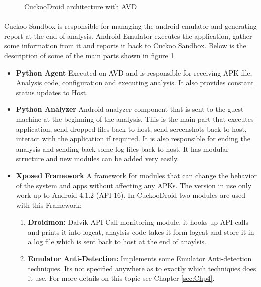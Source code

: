 \documentclass[../main.tex]{subfile}
\begin{document}
		\begin{figure}
			\centering
			\caption{CuckooDroid architecture with AVD}
			\label{fig:cuckoodroid_avd_arch}
		\end{figure}
		
		\paragraph{} Cuckoo Sandbox is responsible for managing the android emulator and generating report at the end of analysis. Android Emulator executes the application, gather some information from it and reports it back to Cuckoo Sandbox. Below is the description of some of the main parts shown in figure \ref{fig:cuckoodroid_avd_arch}
		\begin{itemize}
			\item \textbf{Python Agent} Executed on AVD and is responsible for receiving APK file, Analysis code, configuration and executing analysis. It also provides constant status updates to Host.
			\item \textbf{Python Analyzer} Android analyzer component that is sent to the guest machine at the beginning of the analysis. This is the main part that executes application, send dropped files back to host, send screenshots back to host, interact with the application if required. It is also responsible for ending the analysis and sending back some log files back to host. It has modular structure and new modules can be added very easily.
			\item \textbf{Xposed Framework} A framework for modules that can change the behavior of the system and apps without affecting any APKs. The version in use only work up to Android 4.1.2 (API 16). In CuckooDroid two modules are used with this Framework:
			\begin{enumerate}

				\item \textbf{Droidmon:} Dalvik  API Call monitoring module, it hooks up API calls and prints it into logcat, anaylsis code takes it form logcat and store it in a log file which is sent back to host at the end of anaylsis.
				\item \textbf{Emulator Anti-Detection:} Implements some Emulator Anti-detection techniques. Its not specified anywhere as to exactly which techniques does it use. For more details on this topic see Chapter \ref{sec:Chp4}.
			\end{enumerate}
		\end{itemize}
\end{document}
